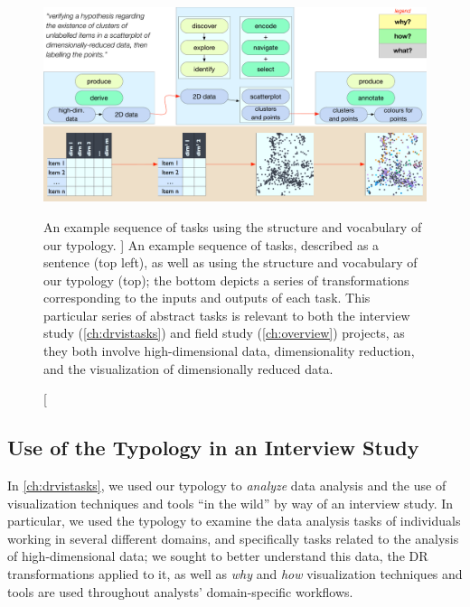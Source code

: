 

\begin{figure}
    \centering
    \includegraphics[width=\textwidth]{figures/typology-example-eps-converted-to.pdf}
    \caption
    [
        An example sequence of tasks using the structure and vocabulary of our typology.
    ]
    {
        An example sequence of tasks, described as a sentence (top left), as well as using the structure and vocabulary of our typology (top); the bottom depicts a series of transformations corresponding to the inputs and outputs of each task. This particular series of abstract tasks is relevant to both the interview study (\autoref{ch:drvistasks}) and field study (\autoref{ch:overview}) projects, as they both involve high-dimensional data, dimensionality reduction, and the visualization of dimensionally reduced data.
    }
    \centering
    \label{fig:typology-example}
\end{figure}



\subsection{Use of the Typology in an Interview Study}
\label{intro:p2}


In \autoref{ch:drvistasks}, we used our typology to {\it analyze} data analysis and the use of visualization techniques and tools ``in the wild'' by way of an interview study.
In particular, we used the typology to examine the data analysis tasks of individuals working in several different domains, and specifically tasks related to the analysis of high-dimensional data; we sought to better understand this data, the \ac{DR} transformations applied to it, as well as {\it why} and {\it how} visualization techniques and tools are used throughout analysts' domain-specific workflows.


